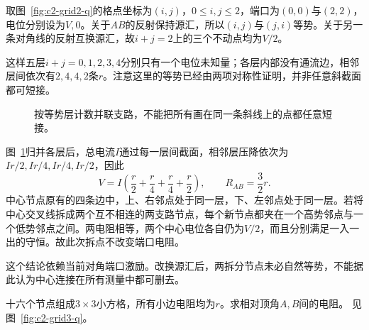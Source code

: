 \begin{solution}
取图~\ref{fig:c2-grid2-q}的格点坐标为$(i,j)$，$0\le i,j\le2$，端口为$(0,0)$与$(2,2)$，电位分别设为$V,0$。关于$AB$的反射保持源汇，所以$(i,j)$与$(j,i)$等势。关于另一条对角线的反射互换源汇，故$i+j=2$上的三个不动点均为$V/2$。

这样五层$i+j=0,1,2,3,4$分别只有一个电位未知量；各层内部没有通流边，相邻层间依次有$2,4,4,2$条$r$。注意这里的等势已经由两项对称性证明，并非任意斜截面都可短接。
\begin{figure}[H]\centering
{}
\caption{按等势层计数并联支路，不能把所有画在同一条斜线上的点都任意短接。}\label{fig:c2-grid2-s}
\end{figure}
图~\ref{fig:c2-grid2-s}归并各层后，总电流$I$通过每一层间截面，相邻层压降依次为$Ir/2,Ir/4,Ir/4,Ir/2$，因此
\[
 V=I\left(\frac r2+\frac r4+\frac r4+\frac r2\right),\qquad
 \boxed{R_{AB}=\frac32r}.
\]
中心节点原有的四条边中，上、右邻点处于同一层，下、左邻点处于同一层。若将中心交叉线拆成两个互不相连的两支路节点，每个新节点都夹在一个高势邻点与一个低势邻点之间。两电阻相等，两个中心电位各自仍为$V/2$，而且分别满足一入一出的守恒。故此次拆点不改变端口电阻。

这个结论依赖当前对角端口激励。改换源汇后，两拆分节点未必自然等势，不能据此认为中心连接在所有测量中都可删去。
\end{solution}

\begin{example}[三阶方格的非等势中间层]\label{ex:c2-grid3}
十六个节点组成$3\times3$小方格，所有小边电阻均为$r$。求相对顶角$A,B$间的电阻。 见图~\ref{fig:c2-grid3-q}。
\end{example}

